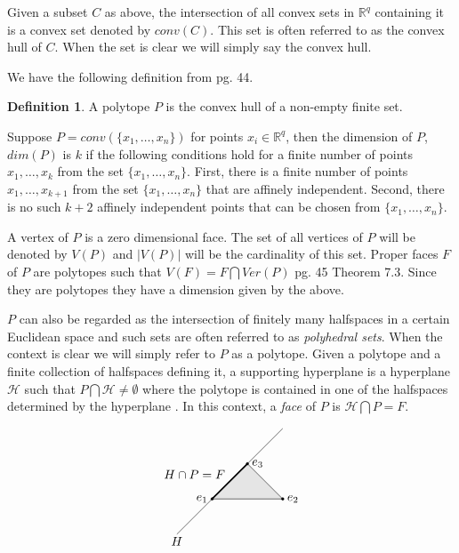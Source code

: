 \documentclass[oneside,12pt]{amsart}
\theoremstyle{definition}
\newtheorem{Definition}[Theorem]{Definition}
\numberwithin{equation}{section}
\begin{document}
Given a subset $C$ as above, the intersection of all convex sets in $\mathbb{R}^q$ containing it is a convex set denoted by $conv(C)$.  This set is often referred to as the convex hull of $C$. When the set is clear we will simply say the convex hull.

We have the following definition from \cite{B} pg. 44.

\begin{Definition}
A polytope $P$ is the convex hull of a non-empty finite set.
\end{Definition}

Suppose $P = conv(\{ x_1,\ldots,x_n \})$ for points $x_i \in \mathbb{R}^q$, then the dimension of $P$, $dim (P)$ is $k$ if the following conditions hold for a finite number of points $x_1,\ldots,x_k$ from the set $\{x_1,\ldots,x_n\}$.  First, there is a finite number of points $x_1,\ldots,x_{k+1}$ from the set $\{x_1,\ldots,x_n\}$ that are affinely independent.  Second, there is no such $k+2$ affinely independent points that can be chosen from $\{x_1,\ldots,x_n\}$.

A vertex of $P$ is a zero dimensional face.  The set of all vertices of $P$ will be denoted by $V(P)$ and $|V(P)|$ will be the cardinality of this set.  Proper faces $F$ of $P$ are polytopes such that $V(F) = F \bigcap Ver(P)$ \cite{B} pg. 45 Theorem 7.3.  Since they are polytopes they have a dimension given by the above.

$P$ can also be regarded as the intersection of finitely many halfspaces in a certain Euclidean space \cite{B, BP1} and such sets are often referred to as \textit{polyhedral sets}.  When the context is clear we will simply refer to $P$ as a polytope.  Given a polytope and a finite collection of halfspaces defining it, a supporting hyperplane is a hyperplane $\mathcal{H}$ such that $P \bigcap \mathcal{H} \neq \emptyset$ where the polytope is contained in one of the halfspaces determined by the hyperplane \cite{BP1}. In this context, a \textit{face} of $P$ is $\mathcal{H} \bigcap P = F$.

\begin{minipage}{\linewidth}
\small
$$\begin{tikzpicture}
\filldraw[color=gray!20] (-1,0)--(1,0)--(0,1)--(-1,0);
\draw (-1,0)--(1,0)--(0,1)--(-1,0);
\draw (-2,-1)--(1,2);
\draw[very thick] (-1,0)--(0,1);
\filldraw[black] (-1,0) node[left=.1pt]{$e_1$} circle (1pt);
\filldraw[black] (1,0) node[right=.1pt]{$e_2$} circle (1pt);
\filldraw[black] (0,1) node[ right=.1pt]{$e_3$} circle (1pt);
\draw (-2,-1.2) node{$H$} ;
\draw (-1.5,.7) node{$H\cap P=F$} ;
\end{tikzpicture}$$
\normalsize
\end{minipage}\\[2ex]
\end{document}

